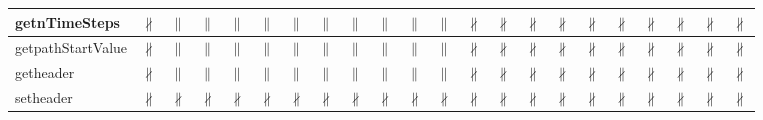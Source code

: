 \documentclass[10pt]{article}
\begin{document}
\begin{longtable}{|l|l|l|l|l|l|l|l|l|l|l|l|l|l|l|l|l|l|l|l|l|l|}
\hline
getnTimeSteps&{\color{BrickRed}$\nparallel$}&{\color{blue}$\parallel$}&{\color{blue}$\parallel$}&{\color{blue}$\parallel$}&{\color{blue}$\parallel$}&{\color{blue}$\parallel$}&{\color{blue}$\parallel$}&{\color{blue}$\parallel$}&{\color{blue}$\parallel$}&{\color{blue}$\parallel$}&{\color{blue}$\parallel$}&{\color{BrickRed}$\nparallel$}&{\color{BrickRed}$\nparallel$}&{\color{BrickRed}$\nparallel$}&{\color{BrickRed}$\nparallel$}&{\color{BrickRed}$\nparallel$}&{\color{BrickRed}$\nparallel$}&{\color{BrickRed}$\nparallel$}&{\color{BrickRed}$\nparallel$}&{\color{BrickRed}$\nparallel$}&{\color{BrickRed}$\nparallel$}\\
\hline
getpathStartValue&{\color{BrickRed}$\nparallel$}&{\color{blue}$\parallel$}&{\color{blue}$\parallel$}&{\color{blue}$\parallel$}&{\color{blue}$\parallel$}&{\color{blue}$\parallel$}&{\color{blue}$\parallel$}&{\color{blue}$\parallel$}&{\color{blue}$\parallel$}&{\color{blue}$\parallel$}&{\color{blue}$\parallel$}&{\color{BrickRed}$\nparallel$}&{\color{BrickRed}$\nparallel$}&{\color{BrickRed}$\nparallel$}&{\color{BrickRed}$\nparallel$}&{\color{BrickRed}$\nparallel$}&{\color{BrickRed}$\nparallel$}&{\color{BrickRed}$\nparallel$}&{\color{BrickRed}$\nparallel$}&{\color{BrickRed}$\nparallel$}&{\color{BrickRed}$\nparallel$}\\
\hline
getheader&{\color{BrickRed}$\nparallel$}&{\color{blue}$\parallel$}&{\color{blue}$\parallel$}&{\color{blue}$\parallel$}&{\color{blue}$\parallel$}&{\color{blue}$\parallel$}&{\color{blue}$\parallel$}&{\color{blue}$\parallel$}&{\color{blue}$\parallel$}&{\color{blue}$\parallel$}&{\color{blue}$\parallel$}&{\color{BrickRed}$\nparallel$}&{\color{BrickRed}$\nparallel$}&{\color{BrickRed}$\nparallel$}&{\color{BrickRed}$\nparallel$}&{\color{BrickRed}$\nparallel$}&{\color{BrickRed}$\nparallel$}&{\color{BrickRed}$\nparallel$}&{\color{BrickRed}$\nparallel$}&{\color{BrickRed}$\nparallel$}&{\color{BrickRed}$\nparallel$}\\
\hline
setheader&{\color{BrickRed}$\nparallel$}&{\color{BrickRed}$\nparallel$}&{\color{BrickRed}$\nparallel$}&{\color{BrickRed}$\nparallel$}&{\color{BrickRed}$\nparallel$}&{\color{BrickRed}$\nparallel$}&{\color{BrickRed}$\nparallel$}&{\color{BrickRed}$\nparallel$}&{\color{BrickRed}$\nparallel$}&{\color{BrickRed}$\nparallel$}&{\color{BrickRed}$\nparallel$}&{\color{BrickRed}$\nparallel$}&{\color{BrickRed}$\nparallel$}&{\color{BrickRed}$\nparallel$}&{\color{BrickRed}$\nparallel$}&{\color{BrickRed}$\nparallel$}&{\color{BrickRed}$\nparallel$}&{\color{BrickRed}$\nparallel$}&{\color{BrickRed}$\nparallel$}&{\color{BrickRed}$\nparallel$}&{\color{BrickRed}$\nparallel$}\\

\end{longtable}
\end{document}
